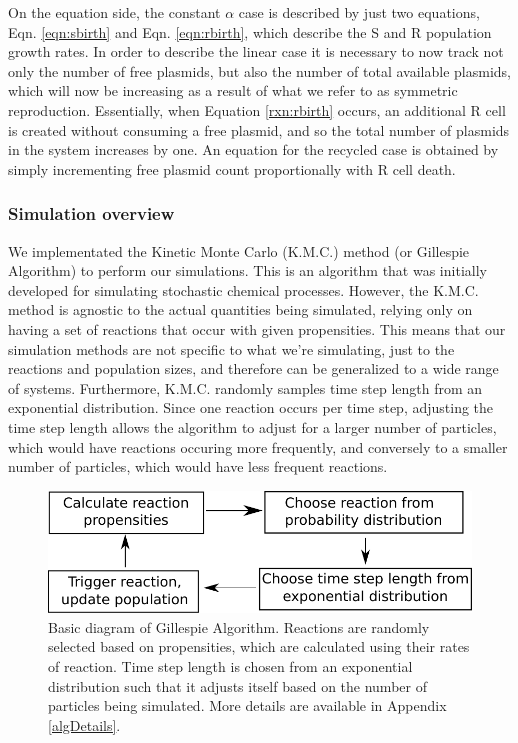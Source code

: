 \documentclass[numbib]{buthesis_p}  %
\begin{document}
On the equation side, the constant $\alpha$ case is described by just two
equations, Eqn. \ref{eqn:sbirth} and Eqn. \ref{eqn:rbirth}, which describe
the S and R population growth rates. In order to describe the linear case it is
necessary to now track not only the number of free plasmids, but also the number
of total available plasmids, which will now be increasing as a result of what
we refer to as symmetric reproduction. Essentially, when Equation \ref{rxn:rbirth}
occurs, an additional R cell is created without consuming a free plasmid, and
so the total number of plasmids in the system increases by one. An equation for
the recycled case is obtained by simply incrementing free plasmid
count proportionally with R cell death.

  \subsubsection{Simulation overview}
We implementated the Kinetic Monte Carlo (K.M.C.) method (or Gillespie Algorithm)
to perform our simulations. This is an
algorithm that was initially developed for simulating stochastic chemical
processes. However, the K.M.C. method is agnostic
to the actual quantities being simulated, relying only on having a set of reactions
that occur with given propensities. This means that our simulation methods are not
specific to what we're simulating, just to the reactions and population sizes, and
therefore can be generalized to a wide range of systems. Furthermore, K.M.C. randomly samples time
step length from an exponential distribution. Since one reaction occurs per time step,
adjusting the time step length allows the algorithm to adjust for a larger
number of particles, which would have reactions occuring more frequently, and
conversely to a smaller number of particles, which would have less frequent reactions.

\begin{figure}
  \centerline{\includegraphics[width=.7\linewidth]{graphics/gillespie.pdf}}
  \caption{Basic diagram of Gillespie Algorithm. Reactions are randomly selected
  based on propensities, which are calculated using their rates of reaction.
  Time step length is chosen from an exponential distribution such that it adjusts
  itself based on the number of particles being simulated. More details are
  available in Appendix \ref{algDetails}.}
\end{figure}
\end{document}
